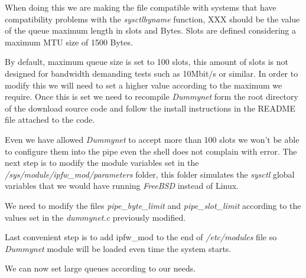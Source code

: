 When doing this we are making the file compatible with systems that have compatibility problems with the {\it sysctlbyname} function, XXX should be the value of the queue maximum length in slots and Bytes. Slots are defined considering a maximum MTU size of 1500 Bytes.

By default, maximum queue size is set to 100 slots, this amount of slots is not designed for bandwidth demanding tests such as 10Mbit/s or similar. In order to modify this we will need to set a higher value according to the maximum we require. Once this is set we need to recompile {\it Dummynet} form the root directory of the download source code and follow the install instructions in the README file attached to the code.

Even we have allowed {\it Dummynet} to accept more than 100 slots we won't be able to configure them into the pipe even the shell does not complain with error. The next step is to modify the module variables set in the {\it /sys/module/ipfw\_mod/parameters} folder, this folder simulates the {\it sysctl} global variables that we would have running {\it FreeBSD} instead of Linux. 

We need to modify the files {\it pipe\_byte\_limit} and {\it pipe\_slot\_limit} according to the values set in the {\it dummynet.c} previously modified.

Last convenient step is to add ipfw\_mod to the end of {\it /etc/modules} file so {\it Dummynet} module will be loaded even time the system starts. 

We can now set large queues according to our needs.
